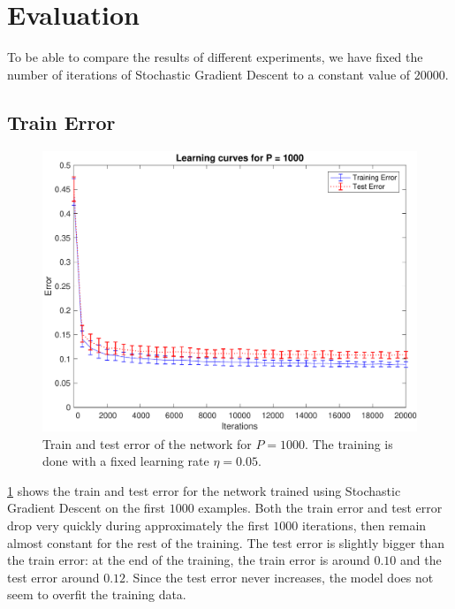 \section{Evaluation}
\label{sec:evaluation}

To be able to compare the results of different experiments, we have fixed the number of iterations of Stochastic Gradient Descent to a constant value of $20000$.

\subsection{Train Error}
\begin{figure}[t]
	\centering
	\includegraphics[width=\columnwidth]{figures/error}
	\caption{Train and test error of the network for $P = 1000$. The training is done with a fixed learning rate $\eta = 0.05$.}
	\label{fig:training_error}
\end{figure}

\cref{fig:training_error} shows the train and test error for the network trained using Stochastic Gradient Descent on the first $1000$ examples.
Both the train error and test error drop very quickly during approximately the first $1000$ iterations, then remain almost constant for the rest of the training.
The test error is slightly bigger than the train error:
at the end of the training, the train error is around $0.10$ and the test error around $0.12$.
Since the test error never increases, the model does not seem to overfit the training data.

